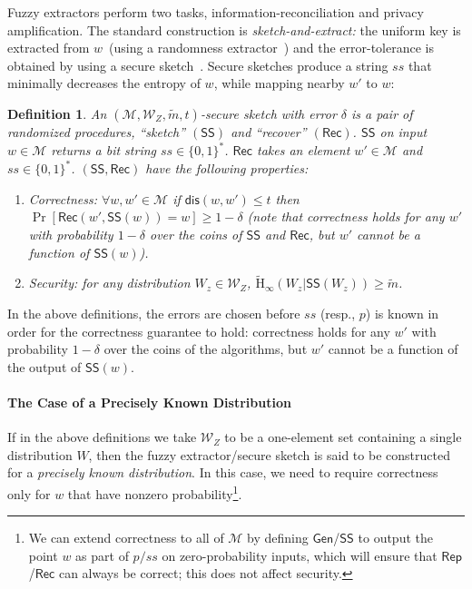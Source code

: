 \documentclass[11pt]{article}
\newcommand{\class}[1]{{\ensuremath{\mathsf{#1}}}}
\newcommand{\gen}{\ensuremath{\class{Gen}}\xspace}
\newcommand{\rep}{\ensuremath{\class{Rep}}\xspace}
\newcommand{\sketch}{\ensuremath{\class{SS}}\xspace}
\newcommand{\rec}{\ensuremath{\class{Rec}}\xspace}
\newcommand{\dis}{\ensuremath{\mathsf{dis}}}
\newcommand{\Hav}{\tilde{\mathrm{H}}_\infty}
\newtheorem{definition}[theorem]{Definition}
\begin{document}
\noindent
Fuzzy extractors perform two tasks, information-reconciliation and privacy amplification.  The standard construction is \emph{sketch-and-extract:} the uniform key is extracted from $w$~(using a randomness extractor~\cite{nisan1993randomness}) and the error-tolerance is obtained by using a secure sketch~\cite[Lemma 4.1]{DBLP:journals/siamcomp/DodisORS08}.  Secure sketches produce a string $ss$ that minimally decreases the entropy of $w$, while mapping nearby $w'$ to $w$:
\begin{definition}
\label{def:secure sketch}
An $(\mathcal{M},\mathcal{W}_Z, \tilde{m}, t)$-\emph{secure sketch} with error $\delta$ is a pair of randomized procedures, ``sketch'' $(\sketch)$ and ``recover'' $(\rec)$.  \sketch on input $w\in\mathcal{M}$ returns a bit string $ss\in\{0,1\}^*$.  \rec takes an element $w'\in\mathcal{M}$ and $ss\in\{0,1\}^*$.  $(\sketch, \rec)$ have the following properties:
\begin{enumerate}
\item \emph{Correctness}: $ \forall w, w'\in\mathcal{M}$ if $\dis(w,w')\leq t$ then $\Pr[\rec(w',\sketch(w))=w]\geq 1-\delta$ (note that correctness holds for any $w'$ with probability $1-\delta$ over the coins of $\sketch$ and $\rec$, but $w'$ cannot be a function of $\sketch(w)$).
\item \emph{Security}: for any distribution $W_z\in\mathcal{W}_Z$, $\Hav(W_z|\sketch(W_z))\geq \tilde{m}$.
\end{enumerate}
\end{definition}


\noindent
In the above definitions, the errors are chosen before $ss$ (resp., $p$) is known in order for the correctness guarantee to hold: correctness holds for any $w'$ with probability $1-\delta$ over the coins of the algorithms, but $w'$ cannot be a function of the output of  $\sketch(w)$. 


\paragraph{The Case of a Precisely Known Distribution}
If in the above definitions we take $\mathcal{W}_Z$ to be a one-element set containing a single distribution $W$, then the fuzzy extractor/secure sketch is said to be constructed for a \emph{precisely known distribution}.  In this case, we need to require correctness only for $w$ that have nonzero probability\footnote{We can extend correctness to all of $\mathcal{M}$ by defining $\gen$/$\sketch$ to output the point $w$ as part of $p/ss$ on zero-probability inputs, which will ensure that $\rep$/$\rec$ can always be correct; this does not affect security.}.
\end{document}
